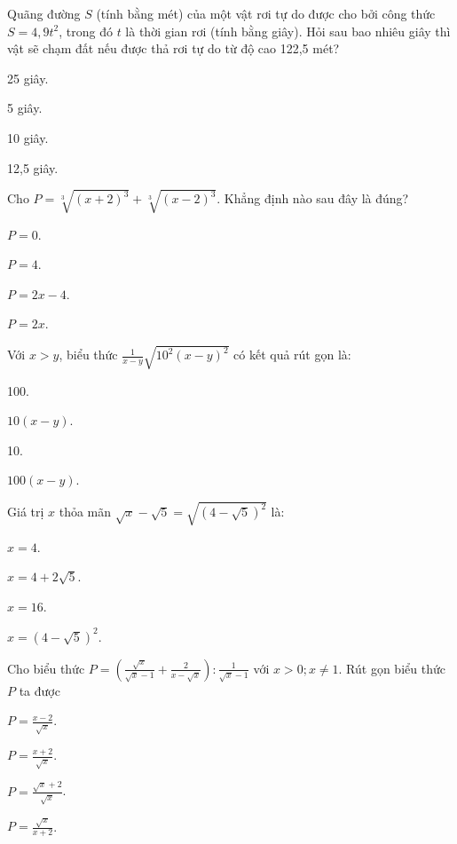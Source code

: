 \documentclass[%
    fontsize=12pt,%
    chapterprefix=false,%
    open=right,%
    twoside=false,%
    numbers=noenddot,%
    headings=optiontohead,%
    final,%
    DIV=15,%
    parskip=half %
]{scrbook}
\begin{document}
\begin{tracnghiem}
\item Quãng đường $ S $ (tính bằng mét) của một vật rơi tự do được cho bởi công thức $ S = 4,9t^2 $, trong đó $ t $ là thời gian rơi (tính bằng giây). Hỏi sau bao nhiêu giây thì vật sẽ chạm đất nếu được thả rơi tự do từ độ cao 122,5 mét?
\begin{options}
  \item 25 giây.
  \item 5 giây.
  \item 10 giây.
  \item 12,5 giây.
\end{options}

\item Cho $ P = \sqrt[3]{(x + 2)^3} + \sqrt[3]{(x - 2)^3} $. Khẳng định nào sau đây là đúng?
\begin{options}
  \item $ P = 0 $.
  \item $ P = 4 $.
  \item $ P = 2x - 4 $.
  \item $ P = 2x $.
\end{options}

\item Với $ x > y $, biểu thức $ \frac{1}{x - y} \sqrt{10^2(x - y)^2} $ có kết quả rút gọn là:
\begin{options}
  \item 100.
  \item $ 10(x - y) $.
  \item 10.
  \item $ 100(x - y) $.
\end{options}

\item Giá trị $ x $ thỏa mãn $ \sqrt{x} - \sqrt{5} = \sqrt{(4 - \sqrt{5})^2} $ là:
\begin{options}
  \item $ x = 4 $.
  \item $ x = 4 + 2\sqrt{5} $.
  \item $ x = 16 $.
  \item $ x = (4 - \sqrt{5})^2 $.
\end{options}

\item Cho biểu thức $ P = \left( \frac{\sqrt{x}}{\sqrt{x} - 1} + \frac{2}{x - \sqrt{x}} \right) : \frac{1}{\sqrt{x} - 1} $ với $ x > 0; x \neq 1 $. Rút gọn biểu thức $ P $ ta được
\begin{options}
  \item $ P = \frac{x - 2}{\sqrt{x}} $.
  \item $ P = \frac{x + 2}{\sqrt{x}} $.
  \item $ P = \frac{\sqrt{x} + 2}{\sqrt{x}} $.
  \item $ P = \frac{\sqrt{x}}{x + 2} $.
\end{options}


\end{tracnghiem}
\end{document}
